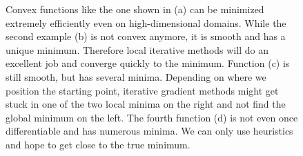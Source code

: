 \begin{figure}
  \centering
  \caption{Convex functions like the one shown in (a) can be minimized extremely
  efficiently even on high-dimensional domains. While the second example (b) is
  not convex anymore, it is smooth and has a unique minimum. Therefore local
  iterative methods will do an excellent job and converge quickly to the
  minimum. Function (c) is still smooth, but has several minima. Depending on
  where we position the starting point, iterative gradient methods might get
  stuck in one of the two local minima on the right and not find the global
  minimum on the left. The fourth function (d) is not even once differentiable
  and has numerous minima. We can only use heuristics and hope to get close to
  the true minimum.}
\label{fig:samplefuncs}
\end{figure}

